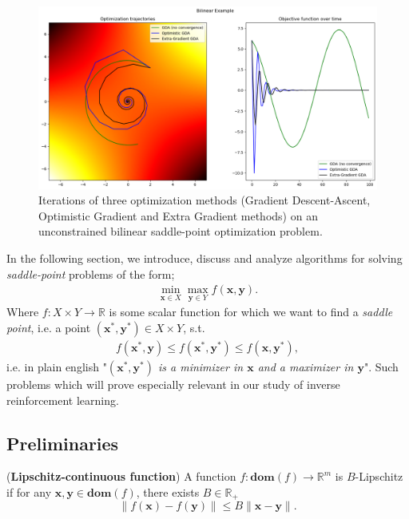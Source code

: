 \begin{figure}[h!]
    \centering
    \includegraphics[width=\textwidth]{figures/bilinear_opt.png}
    \caption{Iterations of three optimization methods (Gradient Descent-Ascent, Optimistic Gradient and Extra Gradient methods) on an unconstrained bilinear saddle-point optimization problem.}
\end{figure}

In the following section, we introduce, discuss and analyze algorithms for solving \textit{saddle-point} problems of the form; 
\begin{align*}
    \min_{\bm{x} \in X} \max_{\bm{y} \in Y} f(\bm{x},\bm{y}).
\end{align*}
Where $f:X \times Y \rightarrow \mathbb{R}$ is some scalar function for which we want to find a \textit{saddle point}, i.e. a point $(\bm{x}^*,\bm{y}^*)\in X \times Y$, s.t.
\begin{align*}
    f(\bm{x}^*,\bm{y}) \leq  f(\bm{x}^*,\bm{y}^*) \leq f(\bm{x},\bm{y}^*),
\end{align*}
i.e. in plain english "\textit{$(\bm{x}^*,\bm{y}^*)$ is a minimizer in $\bm{x}$ and a maximizer in $\bm{y}$}". Such problems which will prove especially relevant in our study of inverse reinforcement learning. \\

\subsection{Preliminaries}

\begin{definition}
    (\textbf{Lipschitz-continuous function}) A function $f: \textbf{dom}(f) \rightarrow \mathbb{R}^m$ is $B$-Lipschitz if for any $\bm{x},\bm{y} \in \textbf{dom}(f)$, there exists $B \in \mathbb{R}_+$\:
    \[
      \|f(\bm{x})-f(\bm{y})\| \leq B \| \bm{x} - \bm{y} \|.
    \]
\end{definition}


